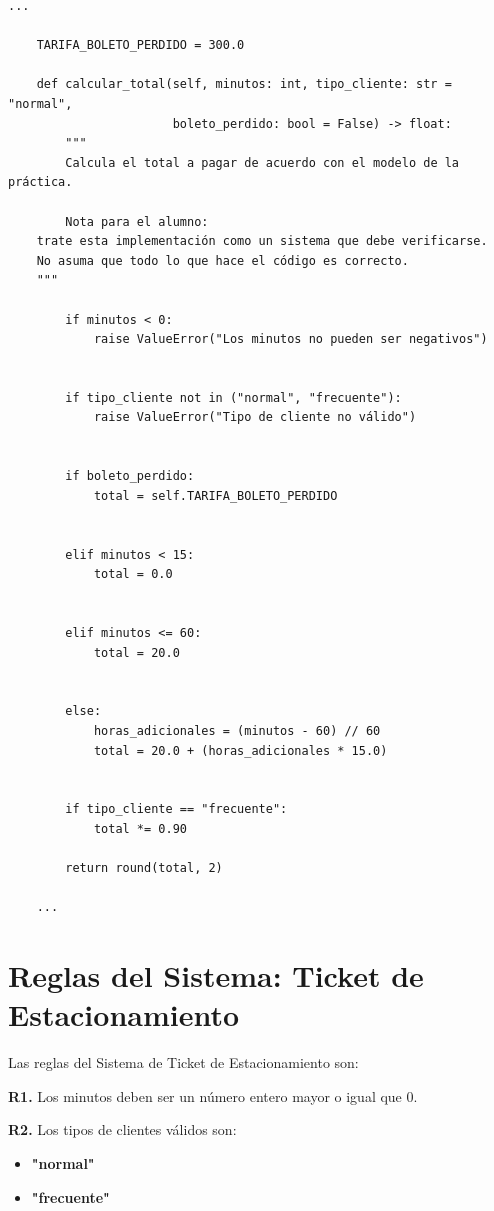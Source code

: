 \documentclass[11pt,letterpaper]{article}
\begin{document}
\begin{lstlisting}[style=practica]
    ...

    TARIFA_BOLETO_PERDIDO = 300.0

    def calcular_total(self, minutos: int, tipo_cliente: str = "normal",
                       boleto_perdido: bool = False) -> float:
        """
        Calcula el total a pagar de acuerdo con el modelo de la práctica.

        Nota para el alumno:
	trate esta implementación como un sistema que debe verificarse.
	No asuma que todo lo que hace el código es correcto.
	"""
    
        if minutos < 0:
            raise ValueError("Los minutos no pueden ser negativos")


        if tipo_cliente not in ("normal", "frecuente"):
            raise ValueError("Tipo de cliente no válido")


        if boleto_perdido:
            total = self.TARIFA_BOLETO_PERDIDO
            

        elif minutos < 15:
            total = 0.0
            

        elif minutos <= 60:
            total = 20.0

	
        else:
            horas_adicionales = (minutos - 60) // 60
            total = 20.0 + (horas_adicionales * 15.0)

	
        if tipo_cliente == "frecuente":
            total *= 0.90

        return round(total, 2)

    ...
\end{lstlisting}
\section{Reglas del Sistema: Ticket de Estacionamiento}
\label{sec:org87e44b6}

Las reglas del Sistema de Ticket de Estacionamiento son:

\begingroup
\setlength{\parskip}{0.85em}

\textbf{R1.} Los minutos deben ser un número entero mayor o igual que 0.

\textbf{R2.} Los tipos de clientes válidos son:

\begin{itemize}
\item \textbf{"normal"}
\item \textbf{"frecuente"}
\end{itemize}
\end{document}
